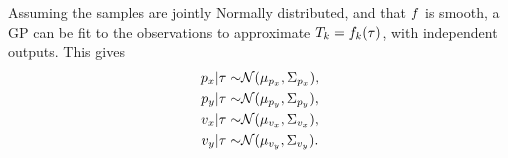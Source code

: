 Assuming the samples are jointly Normally distributed, and
that $f$ is smooth, a GP can be fit to the
observations to approximate $T_{k} = f_{k}(\tau)$, with
independent outputs. This gives
\begin{equation}
  \label{eq:f-posterior}
  \begin{split}
  p_x \vert \tau \sim & \mathcal{N}(\mu_{p_x}, \Sigma_{p_x}), \\
  p_y \vert \tau \sim & \mathcal{N}(\mu_{p_y}, \Sigma_{p_y}), \\
  v_x \vert \tau \sim & \mathcal{N}(\mu_{v_x}, \Sigma_{v_x}), \\
  v_y \vert \tau \sim & \mathcal{N}(\mu_{v_y}, \Sigma_{v_y}).
  \end{split}
\end{equation}

